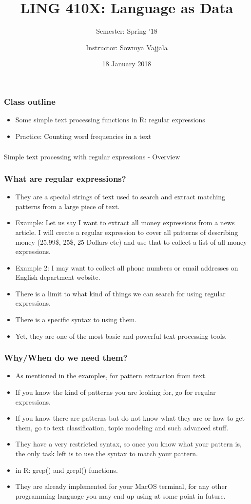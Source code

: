 \documentclass{beamer}
\author[Sowmya Vajjala]{Instructor: Sowmya Vajjala}
\title[LING 410X]{LING 410X: Language as Data}
\subtitle{Semester: Spring '18}
\date{18 January 2018}
\institute{Iowa State University, USA}
\begin{document}
\begin{frame}\titlepage
\end{frame}

\begin{frame}
\frametitle{Class outline}
\begin{itemize}
\item Some simple text processing functions in R: regular expressions %
\item Practice: Counting word frequencies in a text  %
\end{itemize}
\end{frame}

\begin{frame}
\frametitle{}
\Large Simple text processing with regular expressions - Overview
\end{frame}

\begin{frame}
\frametitle{What are regular expressions?}
\begin{itemize}
\item They are a special strings of text used to search and extract matching patterns from a large piece of text.
\item Example: Let us say I want to extract all money expressions from a news article. I will create a regular expression to cover all patterns of describing money (25.99\$, 25\$, 25 Dollars etc) and use that to collect a list of all money expressions. \pause
\item Example 2: I may want to collect all phone numbers or email addresses on English department website. \pause
\item There is a limit to what kind of things we can search for using regular expressions. 
\item There is a specific syntax to using them. 
\item Yet, they are one of the most basic and powerful text processing tools. 
\end{itemize}
\end{frame}

\begin{frame}
\frametitle{Why/When do we need them?}
\begin{itemize}
\item As mentioned in the examples, for pattern extraction from text.
\item If you know the kind of patterns you are looking for, go for regular expressions.
\item If you know there are patterns but do not know what they are or how to get them, go to text classification, topic modeling and such advanced stuff. \pause
\item They have a very restricted syntax, so once you know what your pattern is, the only task left is to use the syntax to match your pattern.\pause
\item in R: grep() and grepl() functions.
\item They are already implemented for your MacOS terminal, for any other programming language you may end up using at some point in future. 
\end{itemize}
\end{frame}
\end{document}
